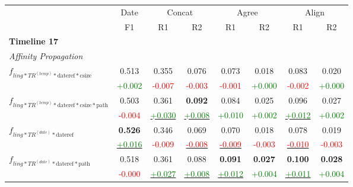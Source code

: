 \documentclass[a4paper,BCOR=10mm]{report}
\numberwithin{lemma}{chapter}
\numberwithin{definition}{chapter}
\begin{document}
\begin{table}
\begin{tabular}{|l|c|cc|cc|cc|}
\hline
 & Date & \multicolumn{ 2 }{|c|}{Concat} & \multicolumn{ 2 }{|c|}{Agree} & \multicolumn{ 2 }{|c|}{Align} \\
 & F1 & R1 & R2 & R1 & R2 & R1 & R2 \\\hline\hline
\multicolumn{8}{|l|}{ \textbf{Timeline 17} }\\\hline
\multicolumn{8}{|l|}{ \textit{Affinity Propagation} }\\\hline
\multirow{2}{*}{$f_{ling*TR^{(temp)}*\text{dateref}*\text{csize}}$} & 0.513 & 0.355 & 0.076 & 0.073 & 0.018 & 0.083 & 0.020 \\
    & \small \textcolor{green}{+0.002}  & \small \textcolor{red}{-0.007}    & \small \textcolor{red}{-0.003}    & \small \textcolor{red}{-0.001}    & \small \textcolor{green}{+0.000}  & \small \textcolor{red}{-0.002}    & \small \textcolor{green}{+0.000} \\\hline
\multirow{2}{*}{$f_{ling*TR^{(temp)}*\text{dateref}*\text{csize}*\text{path}}$} & 0.503 & 0.361 & \textbf{0.092}    & 0.084 & 0.025 & 0.096 & 0.027 \\
    & \small \textcolor{red}{-0.004}    & \underline{\small \textcolor{green}{+0.030}}  & \underline{\small \textcolor{green}{+0.008}}  & \small \textcolor{green}{+0.010}  & \small \textcolor{green}{+0.002}  & \underline{\small \textcolor{green}{+0.012}}  & \small \textcolor{green}{+0.002} \\\hline
\multirow{2}{*}{$f_{ling*TR^{(date)}*\text{dateref}}$}  & \textbf{0.526}    & 0.346 & 0.069 & 0.070 & 0.018 & 0.078 & 0.019 \\
    & \underline{\small \textcolor{green}{+0.016}}  & \small \textcolor{red}{-0.009}    & \underline{\small \textcolor{red}{-0.008}}    & \underline{\small \textcolor{red}{-0.009}}    & \small \textcolor{red}{-0.003}    & \underline{\small \textcolor{red}{-0.010}}    & \small \textcolor{red}{-0.003} \\\hline
\multirow{2}{*}{$f_{ling*TR^{(date)}*\text{dateref}*\text{path}}$}  & 0.518 & 0.361 & 0.088 & \textbf{0.091}    & \textbf{0.027}    & \textbf{0.100}    & \textbf{0.028} \\
    & \small \textcolor{red}{-0.000}    & \underline{\small \textcolor{green}{+0.027}}  & \underline{\small \textcolor{green}{+0.008}}  & \underline{\small \textcolor{green}{+0.012}}  & \small \textcolor{green}{+0.004}  & \underline{\small \textcolor{green}{+0.011}}  & \small \textcolor{green}{+0.004} \\\hline

\end{tabular}
\end{table}
\end{document}
